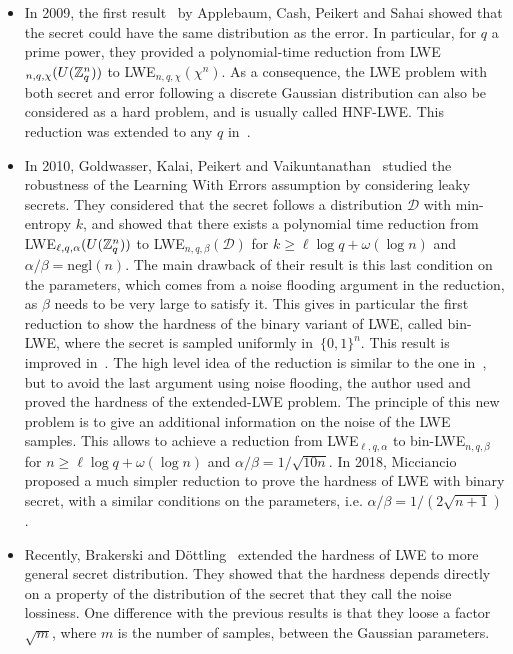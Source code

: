 \begin{itemize}
\item In 2009, the first result~\cite{ACPS09} by Applebaum, Cash, Peikert and Sahai showed that the secret could have the same distribution as the error. In particular, for $q$ a prime power, they provided a polynomial-time reduction from LWE$_{n,q,\chi}(U(\mathbb{Z}_q^n))$ to LWE$_{n,q,\chi}(\chi^n)$. As a consequence, the LWE problem with both secret and error following a discrete Gaussian distribution can also be considered as a hard problem, and is usually called HNF-LWE. This reduction was extended to any $q$ in~\cite{BLPRS13}.
\item In 2010, Goldwasser, Kalai, Peikert and Vaikuntanathan~\cite{GKPV10} studied the robustness of the Learning With Errors assumption by considering leaky secrets. They considered that the secret follows a distribution $\mathcal{D}$ with min-entropy $k$, and showed that there exists a polynomial time reduction from LWE$_{\ell,q,\alpha}(U(\mathbb{Z}_q^n))$ to LWE$_{n,q,\beta}(\mathcal{D})$ for $k \geq \ell \log q + \omega( \log n)$ and $\alpha / \beta = \text{negl}(n)$. The main drawback of their result is this last condition on the parameters, which comes from a noise flooding argument in the reduction, as $\beta$ needs to be very large to satisfy it. This gives in particular the first reduction to show the hardness of the binary variant of LWE, called bin-LWE, where the secret is sampled uniformly in~$\{0,1\}^n$. This result is improved in~\cite{BLPRS13}. The high level idea of the reduction is similar to the one in~\cite{GKPV10}, but to avoid the last argument using noise flooding, the author used and proved the hardness of the extended-LWE problem. The principle of this new problem is to give an additional information on the noise of the LWE samples. This allows to achieve a reduction from LWE$_{\ell,q,\alpha}$ to bin-LWE$_{n,q,\beta}$ for $n \geq \ell \log q + \omega( \log n)$ and $\alpha / \beta = 1 / \sqrt{10n}$.
In 2018, Micciancio~\cite{Mic18} proposed a much simpler reduction to prove the hardness of LWE with binary secret, with a similar conditions on the parameters, i.e. $\alpha / \beta = 1 / (2 \sqrt{n+1})$.
\item Recently, Brakerski and Döttling~\cite{BD20} extended the hardness of LWE to more general secret distribution. They showed that the hardness depends directly on a property of the distribution of the secret that they call the noise lossiness. One difference with the previous results is that they loose a factor $\sqrt{m}$, where $m$ is the number of samples, between the Gaussian parameters.
\end{itemize}
